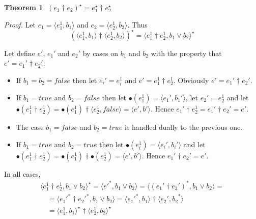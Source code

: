 \documentclass[preprint]{sigplanconf}
\newcommand{\true}{\mathit{true}}
\newcommand{\false}{\mathit{false}}
\newcommand{\varoast}{\star}
\newcounter{item}
\newtheorem{theorem}[item]{Theorem}
\newenvironment{proof}{\begin{trivlist}\item[]{\em Proof.}}{\end{trivlist}}
\begin{document}
\begin{theorem}
$
(e_1 \dagger e_2)^\varoast = e_1^\varoast \dagger e_2^\varoast
$
\end{theorem}
\begin{proof}
Let $e_1 = \langle e_1^1,b_1 \rangle$ and $e_2 = \langle e_2^1,b_2 \rangle$.
Thus
$$
(\langle e_1^1,b_1 \rangle \dagger \langle e_2^1,b_2 \rangle)^\varoast
= \langle e_1^1 \dagger e_2^1, b_1 \vee b_2 \rangle^\varoast
$$

Let define $e'$, $e_1'$ and $e_2'$ by cases on $b_1$ and $b_2$ with
the property that $e' = e_1' \dagger e_2'$:
\begin{itemize}
 \item If $b_1 = b_2 = \false$ then let $e_i' = e_i^1$ and
  $e' = e_1^1 \dagger e_2^1$. Obviously $e' = e_1' \dagger e_2'$.
 \item If $b_1 = \true$ and $b_2 = \false$ then
   let $\bullet (e_1^1) = \langle e_1', b_1' \rangle$, let
   $e_2' = e^1_2$ and let $\bullet (e_1^1 \dagger e_2^1) =
   \bullet (e_1^1) \dagger \langle e_2^1, \false \rangle =
   \langle e',b' \rangle$. Hence $e_1' \dagger e_2^1 = e_1' \dagger e_2' = e'$.
 \item The case $b_1 = \false$ and $b_2 = \true$ is handled dually to the
   previous one.
 \item If $b_1 = \true$ and $b_2 = \true$ then
   let $\bullet (e_i^1) = \langle e_i', b_i' \rangle$
   and let $\bullet (e_1^1 \dagger e_2^1) =
   \bullet (e_1^1) \dagger \bullet (e_2^1) =
   \langle e',b' \rangle$. Hence $e_1' \dagger e_2' = e'$.
\end{itemize}

In all cases,
$$\begin{array}{l}
 \langle e_1^1 \dagger e_2^1, b_1 \vee b_2 \rangle^\varoast
= \langle {e'}^*, b_1 \vee b_2 \rangle
= \langle (e_1' \dagger e_2')^*, b_1 \vee b_2 \rangle =\\
\quad = \langle {e_1'}^* \dagger {e_2'}^*, b_1 \vee b_2 \rangle
= \langle {e_1'}^*, b_1 \rangle \dagger
  \langle {e_2', b_2}^* \rangle \\
\quad = \langle e_1^1, b_1 \rangle^\varoast \dagger
  \langle e_2^1, b_2 \rangle^\varoast
\end{array}$$
\end{proof}
\end{document}
